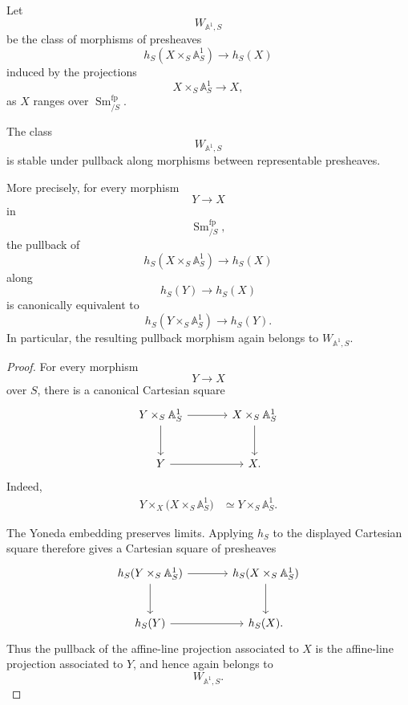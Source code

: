 \begin{definition}
\label{def:affine-line-projection-class}
Let
\[
    W_{\mathbb A^1,S}
\]
be the class of morphisms of presheaves
\[
    h_S(X\times_S\mathbb A^1_S)
    \longrightarrow
    h_S(X)
\]
induced by the projections
\[
    X\times_S\mathbb A^1_S
    \longrightarrow
    X,
\]
as $X$ ranges over $\operatorname{Sm}^{\mathrm{fp}}_{/S}$.
\end{definition}

\begin{proposition}
\label{prop:affine-line-projection-pullback}
The class
\[
    W_{\mathbb A^1,S}
\]
is stable under pullback along morphisms between representable
presheaves.

More precisely, for every morphism
\[
    Y
    \longrightarrow
    X
\]
in
\[
    \operatorname{Sm}^{\mathrm{fp}}_{/S},
\]
the pullback of
\[
    h_S(X\times_S\mathbb A^1_S)
    \longrightarrow
    h_S(X)
\]
along
\[
    h_S(Y)
    \longrightarrow
    h_S(X)
\]
is canonically equivalent to
\[
    h_S(Y\times_S\mathbb A^1_S)
    \longrightarrow
    h_S(Y).
\]
In particular, the resulting pullback morphism again belongs to
\(W_{\mathbb A^1,S}\).
\end{proposition}

\begin{proof}
For every morphism
\[
    Y
    \longrightarrow
    X
\]
over \(S\), there is a canonical Cartesian square
\[
\begin{tikzcd}[column sep=large, row sep=large]
    Y\times_S\mathbb A^1_S
        \arrow[r]
        \arrow[d]
    &
    X\times_S\mathbb A^1_S
        \arrow[d]
    \\
    Y
        \arrow[r]
    &
    X.
\end{tikzcd}
\]
Indeed,
\[
\begin{aligned}
    Y\times_X
    \bigl(
        X\times_S\mathbb A^1_S
    \bigr)
    &\simeq
    Y\times_S\mathbb A^1_S.
\end{aligned}
\]

The Yoneda embedding preserves limits. Applying \(h_S\) to the displayed
Cartesian square therefore gives a Cartesian square of presheaves
\[
\begin{tikzcd}[column sep=large, row sep=large]
    h_S(Y\times_S\mathbb A^1_S)
        \arrow[r]
        \arrow[d]
    &
    h_S(X\times_S\mathbb A^1_S)
        \arrow[d]
    \\
    h_S(Y)
        \arrow[r]
    &
    h_S(X).
\end{tikzcd}
\]
Thus the pullback of the affine-line projection associated to \(X\) is
the affine-line projection associated to \(Y\), and hence again belongs
to
\[
    W_{\mathbb A^1,S}.
\]
\end{proof}

